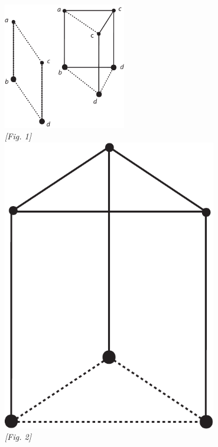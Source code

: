               \begin{center}
              \includegraphics[width=0.4\textwidth]{images/35_15_6_56r1}\\
              \textit{[Fig. 1]}\\
              \vspace{2.0ex}
              \includegraphics[width=0.7\textwidth]{images/35_15_6_56r2}\\
              \textit{[Fig. 2]}\\
              \clearpage
              \end{center}
              